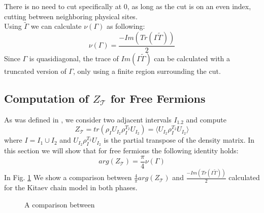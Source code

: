 \documentclass[%
 reprint,
 amsmath,amssymb,
 aps,
]{revtex4-2}
\begin{document}
There is no need to cut specifically at $0$, as long as the cut is on an even index, cutting between neighboring physical sites. \\
Using $\tilde\Gamma$ we can calculate $\nu(\Gamma)$ as following:
\begin{equation}
    \nu(\Gamma) = \frac{-Im\left(Tr(\Gamma\tilde\Gamma)\right)}{2}
\end{equation}
Since $\Gamma$ is quasidiagonal, the trace of $Im(\Gamma\tilde\Gamma)$ can be calculated with a truncated version of $\Gamma$, only using a finite region surrounding the cut.

\subsection{Computation of $Z_\mathcal{T}$ for Free Fermions}
As was defined in \cite{shap2017}, we consider two adjacent intervals $I_{1.2}$ and compute
\begin{equation}
    Z_{\mathcal{T}}=tr(\rho_IU_{I_2}\rho_I^{T_2}U_{I_2})=\langle U_{I_2}\rho_I^{T_2}U_{I_2} \rangle
\end{equation}
where $I=I_1\cup I_2$ and $U_{I_2}\rho_I^{T_2}U_{I_2}$ is the partial transpose of the density matrix. In this section we will show that for free fermions the following identity holds:
\begin{equation}
    arg(Z_{\mathcal{T}}) = \frac{\pi}{4}\nu(\Gamma)
\end{equation}
In Fig. \ref{fig:bdi index comparison} We show a comparison between $\frac{4}{\pi}arg(Z_{\mathcal{T}})$ and $\frac{-Im\left(Tr(\Gamma\tilde\Gamma)\right)}{2}$ calculated for the Kitaev chain model in both phases.

\begin{figure}[h]
\centering

\caption{\label{fig:bdi index comparison} A comparison between}
\end{figure}
\end{document}
